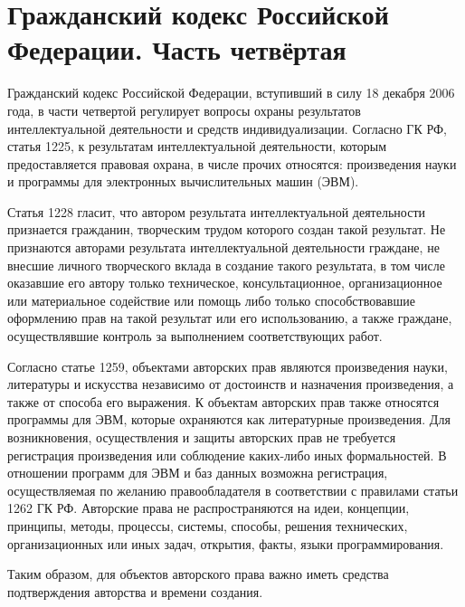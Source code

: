 \section{Гражданский кодекс Российской Федерации. Часть четвёртая} \label{rights_gk}

Гражданский кодекс Российской Федерации, вступивший в силу 18 декабря 2006 года, в части четвертой регулирует вопросы охраны результатов интеллектуальной деятельности и  средств индивидуализации. Согласно ГК РФ, статья 1225, к результатам интеллектуальной деятельности, которым предоставляется правовая охрана, в числе прочих относятся: произведения науки и программы для электронных вычислительных машин (ЭВМ).

\vspace{\baselineskip}
Статья 1228 гласит, что автором результата интеллектуальной деятельности признается гражданин, творческим трудом которого создан такой результат. Не признаются авторами результата интеллектуальной деятельности граждане, не внесшие личного творческого вклада в создание такого результата, в том числе оказавшие его автору только техническое, консультационное, организационное или материальное содействие или помощь либо только способствовавшие оформлению прав на такой результат или его использованию, а также граждане, осуществлявшие контроль за выполнением соответствующих работ.

\vspace{\baselineskip}
Согласно статье 1259, объектами авторских прав являются произведения науки, литературы и искусства независимо от достоинств и назначения произведения, а также от способа его выражения. К объектам авторских прав также относятся программы для ЭВМ, которые охраняются как литературные произведения. Для возникновения, осуществления и защиты авторских прав не требуется регистрация произведения или соблюдение каких-либо иных формальностей. В отношении программ для ЭВМ и баз данных возможна регистрация, осуществляемая по желанию правообладателя в соответствии с правилами статьи 1262 ГК РФ. Авторские права не распространяются на идеи, концепции, принципы, методы, процессы, системы, способы, решения технических, организационных или иных задач, открытия, факты, языки программирования.

\vspace{\baselineskip}
Таким образом, для объектов авторского права важно иметь средства подтверждения авторства и времени создания.